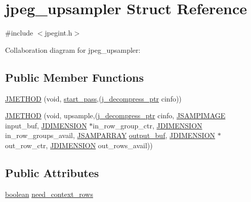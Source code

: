 \hypertarget{structjpeg__upsampler}{}\section{jpeg\+\_\+upsampler Struct Reference}
\label{structjpeg__upsampler}


{\ttfamily \#include $<$jpegint.\+h$>$}



Collaboration diagram for jpeg\+\_\+upsampler\+:
\subsection*{Public Member Functions}
\begin{DoxyCompactItemize}
\item 
\mbox{\hyperlink{structjpeg__upsampler_a01ac725bfe78e05e7671547504a95346}{J\+M\+E\+T\+H\+OD}} (void, \mbox{\hyperlink{jddctmgr_8c_a1964f006adb8fb80f57e455f6452aec1}{start\+\_\+pass}},(\mbox{\hyperlink{jpeglib_8h_a00c7d78af44bd26a901c791ccfc1e178}{j\+\_\+decompress\+\_\+ptr}} cinfo))
\item 
\mbox{\hyperlink{structjpeg__upsampler_a23e9af5ee7259d39179063e3ece9fb8f}{J\+M\+E\+T\+H\+OD}} (void, upsample,(\mbox{\hyperlink{jpeglib_8h_a00c7d78af44bd26a901c791ccfc1e178}{j\+\_\+decompress\+\_\+ptr}} cinfo, \mbox{\hyperlink{jpeglib_8h_a4bf858e4d42202287e786bdec2f3b62b}{J\+S\+A\+M\+P\+I\+M\+A\+GE}} input\+\_\+buf, \mbox{\hyperlink{jmorecfg_8h_a04ed4674f6f1d0d50ec241531e38274f}{J\+D\+I\+M\+E\+N\+S\+I\+ON}} $\ast$in\+\_\+row\+\_\+group\+\_\+ctr, \mbox{\hyperlink{jmorecfg_8h_a04ed4674f6f1d0d50ec241531e38274f}{J\+D\+I\+M\+E\+N\+S\+I\+ON}} in\+\_\+row\+\_\+groups\+\_\+avail, \mbox{\hyperlink{jpeglib_8h_ac9d5d1b829ed51769db69a37271a7e91}{J\+S\+A\+M\+P\+A\+R\+R\+AY}} \mbox{\hyperlink{jdct_8h_ad7e4660a191b1a791748dd44d5a7a0ec}{output\+\_\+buf}}, \mbox{\hyperlink{jmorecfg_8h_a04ed4674f6f1d0d50ec241531e38274f}{J\+D\+I\+M\+E\+N\+S\+I\+ON}} $\ast$out\+\_\+row\+\_\+ctr, \mbox{\hyperlink{jmorecfg_8h_a04ed4674f6f1d0d50ec241531e38274f}{J\+D\+I\+M\+E\+N\+S\+I\+ON}} out\+\_\+rows\+\_\+avail))
\end{DoxyCompactItemize}
\subsection*{Public Attributes}
\begin{DoxyCompactItemize}
\item 
\mbox{\hyperlink{jmorecfg_8h_a7c6368b321bd9acd0149b030bb8275ed}{boolean}} \mbox{\hyperlink{structjpeg__upsampler_af1ed2e1ca01280221b9c1305fc557e45}{need\+\_\+context\+\_\+rows}}
\end{DoxyCompactItemize}


